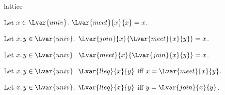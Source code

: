 \documentclass{stex}
\begin{document}
\begin{smodule}{lattice}
\begin{forthel}
    \begin{proposition}
      Let $x\in\Lvar{univ}$.
      $\Lvar{meet}{x}{x}=x$.
    \end{proposition}

    \begin{proposition}
      Let $x,y\in\Lvar{univ}$.
      $\Lvar{join}{x}{\Lvar{meet}{x}{y}}=x$.
    \end{proposition}

    \begin{proposition}
      Let $x,y\in\Lvar{univ}$.
      $\Lvar{meet}{x}{\Lvar{join}{x}{y}}=x$.
    \end{proposition}

    \begin{proposition}
      Let $x,y\in\Lvar{univ}$.
      $\Lvar{lleq}{x}{y}$ iff $x=\Lvar{meet}{x}{y}$.
    \end{proposition}

    \begin{proposition}
      Let $x,y\in\Lvar{univ}$.
      $\Lvar{lleq}{x}{y}$ iff $y=\Lvar{join}{x}{y}$.
    \end{proposition}
  \end{forthel}
\end{smodule}
\end{document}
